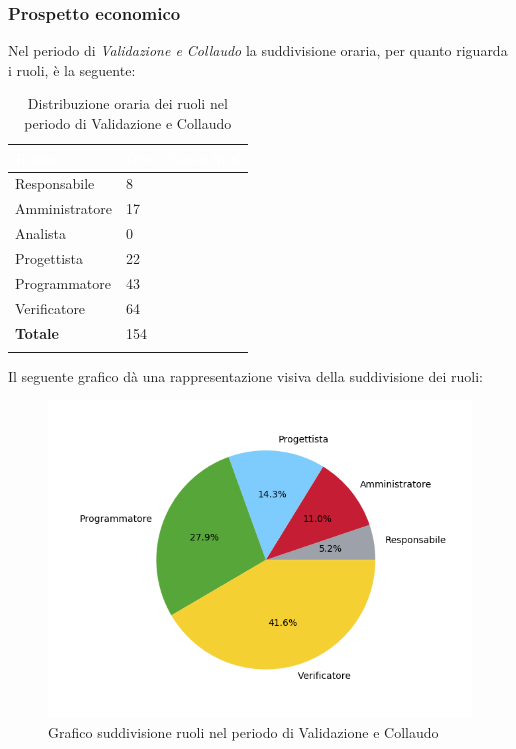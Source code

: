 \subsubsection{Prospetto economico}
Nel periodo di \textit{Validazione e Collaudo} la suddivisione oraria, per quanto riguarda i ruoli, è la seguente: 


\begin{longtable}{| C{.30\textwidth}| C{.15\textwidth}| C{.20\textwidth}|}
	\hline
	\textbf{\textcolor{white}{Ruolo}} & \textbf{\textcolor{white}{Ore}} & \textbf{\textcolor{white}{Costo in \euro}} \\
	\hline 
	Responsabile & 8 &  \\
	\hline
	Amministratore & 17 & \\
	\hline
	Analista & 0 &  \\
	\hline
	Progettista & 22 &  \\
	\hline
	Programmatore & 43 &  \\
	\hline
	Verificatore & 64 &  \\
	\hline
	\textbf{Totale} & 154 & \\ 
	\hline
	
	\caption{Distribuzione oraria dei ruoli nel periodo di Validazione e Collaudo}
	\label{Distribuzione oraria del periodo di Validazione e collaudo}
\end{longtable}

Il seguente grafico dà una rappresentazione visiva della suddivisione dei ruoli:
\begin{figure}[H]
	\centering
	\includegraphics[width=1\linewidth]{./images/torta_vc.png}
	\caption{Grafico suddivisione ruoli nel periodo di Validazione e Collaudo}
	\label{fig:grafico suddivione ruoli periodo di Validazione e collaudo}
\end{figure}

